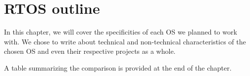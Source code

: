 \chapter{RTOS outline}

In this chapter, we will cover the specificities of each OS we planned to work with.
We chose to write about technical and non-technical characteristics of the chosen OS and even their respective projects as a whole.


A table summarizing the comparison is provided at the end of the chapter.






